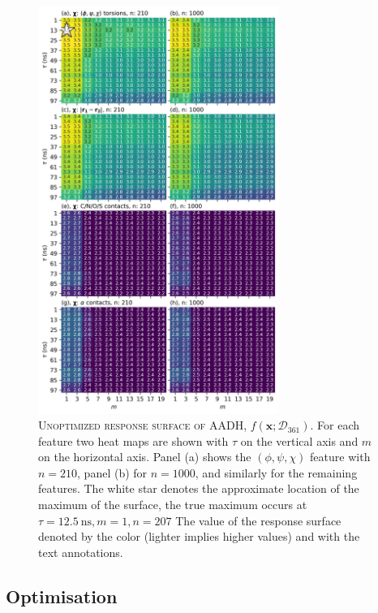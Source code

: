 \begin{figure}[p]
    \centering
    \includegraphics[width=0.7\textwidth]{chapters/msm_optimization/figures/aadh_response_surface_d.png}
    \caption[Unoptimized response surface of AADH]{\textsc{Unoptimized response surface of AADH, $f\left(\mathbf{x}; \mathcal{D}_{361}\right)$}. For each feature two heat maps are shown with $\tau$ on the vertical axis and $m$ on the horizontal axis. Panel (a) shows the  $(\phi, \psi, \chi)$ feature  with $n=210$,  panel (b) for $n=1000$,  and similarly for the remaining features. The white star denotes the approximate location of the maximum of the surface, the true maximum occurs at $\tau=\SI{12.5}{\nano\second}, m=1, n=207$  The value of the response surface denoted by the color (lighter implies higher values) and with the text annotations.}
    \label{fig:aadh_rsm}
\end{figure}

\subsection{Optimisation}\label{sec:aadh_bayes_opt}

